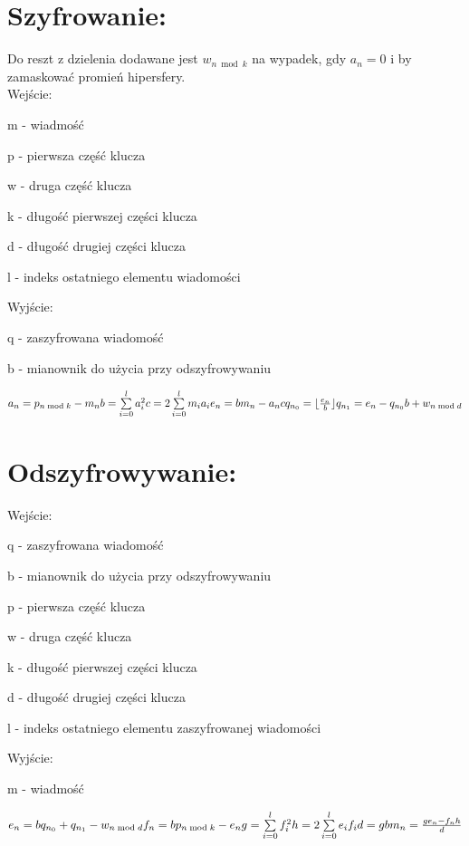 \documentclass[11pt]{article}
\newcommand{\floor}[1]{\lfloor #1 \rfloor}
\begin{document}
	\section{Szyfrowanie:}
	Do reszt z dzielenia dodawane jest \ensuremath{w_{n\bmod{k}}} na wypadek, gdy \ensuremath{a_n = 0} i by zamaskować promień hipersfery. \\
	Wejście:
	\begin{description}
	\item m - wiadmość
	\item p - pierwsza część klucza
	\item w - druga część klucza
	\item k - długość pierwszej części klucza
	\item d - długość drugiej części klucza
	\item l - indeks ostatniego elementu wiadomości
	\end{description}
	Wyjście:
	\begin{description}
	\item q - zaszyfrowana wiadomość
	\item b - mianownik do użycia przy odszyfrowywaniu
	\end{description} 
	\ensuremath {
		a_n = p_{n \bmod{k}} - m_n \\
		b = \sum\limits_{i=0}^l a_i^2 \\
		c = 2\sum\limits_{i=0}^l m_ia_i \\
		e_n = bm_n - a_nc \\
		q_{n_0} = \floor{\frac{e_n}{b}}  \\
		q_{n_1} = e_n  - q_{n_0}b + w_{n\bmod{d}} 
	}
	\newpage
	\section{Odszyfrowywanie:}
	Wejście:
	\begin{description}
	\item q - zaszyfrowana wiadomość
	\item b - mianownik do użycia przy odszyfrowywaniu
	\item p - pierwsza część klucza
	\item w - druga część klucza
	\item k - długość pierwszej części klucza
	\item d - długość drugiej części klucza
	\item l - indeks ostatniego elementu zaszyfrowanej wiadomości
	\end{description} 
	Wyjście:
	\begin{description}
	\item m - wiadmość
	\end{description}
	\ensuremath {
		e_n = bq_{n_0} + q_{n_1} - w_{n\bmod{d}} \\
		f_n = bp_{n \bmod{k}} - e_n \\
		g = \sum\limits_{i=0}^l f_i^2 \\
		h = 2\sum\limits_{i=0}^l e_if_i \\
		d = gb \\
		m_n = \frac{ge_n - f_nh}{d}
	}
\end{document}
